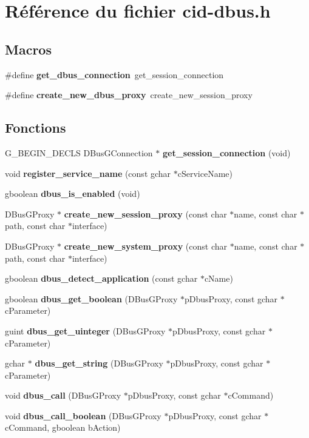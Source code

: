 \section{Référence du fichier cid-dbus.h}
\label{cid-dbus_8h}
\subsection*{Macros}
\begin{CompactItemize}
\item 
\#define {\bf get\_\-dbus\_\-connection}~get\_\-session\_\-connection
\item 
\#define {\bf create\_\-new\_\-dbus\_\-proxy}~create\_\-new\_\-session\_\-proxy
\end{CompactItemize}
\subsection*{Fonctions}
\begin{CompactItemize}
\item 
G\_\-BEGIN\_\-DECLS DBusGConnection $\ast$ {\bf get\_\-session\_\-connection} (void)
\item 
void {\bf register\_\-service\_\-name} (const gchar $\ast$cServiceName)
\item 
gboolean {\bf dbus\_\-is\_\-enabled} (void)
\item 
DBusGProxy $\ast$ {\bf create\_\-new\_\-session\_\-proxy} (const char $\ast$name, const char $\ast$path, const char $\ast$interface)
\item 
DBusGProxy $\ast$ {\bf create\_\-new\_\-system\_\-proxy} (const char $\ast$name, const char $\ast$path, const char $\ast$interface)
\item 
gboolean {\bf dbus\_\-detect\_\-application} (const gchar $\ast$cName)
\item 
gboolean {\bf dbus\_\-get\_\-boolean} (DBusGProxy $\ast$pDbusProxy, const gchar $\ast$cParameter)
\item 
guint {\bf dbus\_\-get\_\-uinteger} (DBusGProxy $\ast$pDbusProxy, const gchar $\ast$cParameter)
\item 
gchar $\ast$ {\bf dbus\_\-get\_\-string} (DBusGProxy $\ast$pDbusProxy, const gchar $\ast$cParameter)
\item 
void {\bf dbus\_\-call} (DBusGProxy $\ast$pDbusProxy, const gchar $\ast$cCommand)
\item 
void {\bf dbus\_\-call\_\-boolean} (DBusGProxy $\ast$pDbusProxy, const gchar $\ast$cCommand, gboolean bAction)
\end{CompactItemize}


